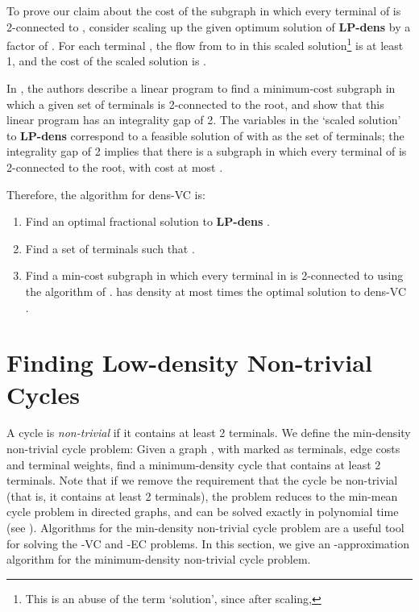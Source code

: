 \documentclass[11pt]{article}
\newcommand{\kec}[1]{-{\sc EC} }
\newcommand{\kvc}[1]{-{\sc VC} }
\newcommand{\ke}{\kec{2}}
\newcommand{\kv}{\kvc{2}}
\newcommand{\densV}{dens-{\sc VC} }
\newcommand{\densLP}{{\bf LP-dens} }
\begin{document}
To prove our claim about the cost of the subgraph  in which every
terminal of  is 2-connected to , consider scaling up the given
optimum solution of \densLP by a factor of . For each
terminal , the flow from  to  in this scaled
solution\footnote{This is an abuse of the term `solution', since after
  scaling, } is at least 1, and the cost
of the scaled solution is .

In \cite{FleischerJW}, the authors describe a linear program  to
find a minimum-cost subgraph in which a given set of terminals is
2-connected to the root, and show that this linear program has an
integrality gap of 2. The variables  in the `scaled solution' to
\densLP correspond to a feasible solution of  with  as the
set of terminals; the integrality gap of 2 implies that there is a
subgraph  in which every terminal of  is 2-connected to the
root, with cost at most .

Therefore, the algorithm for \densV is: 
\begin{enumerate}
  \item Find an optimal fractional solution to \densLP.

  \item Find a set of terminals  such that .

  \item Find a min-cost subgraph  in which every terminal in 
    is 2-connected to  using the algorithm of \cite{FleischerJW}.
     has density at most  times the optimal solution
    to \densV.
\end{enumerate}

\section{Finding Low-density Non-trivial Cycles}
\label{sec:cycles}

A cycle  is \emph{non-trivial} if it contains at least 2
terminals.  We define the min-density non-trivial cycle problem: Given a
graph , with  marked as terminals, edge costs and
terminal weights, find a minimum-density cycle that contains at least 2
terminals. Note that if we remove the requirement that the cycle be
non-trivial (that is, it contains at least 2 terminals), the problem
reduces to the min-mean cycle problem in directed graphs, and can be solved
exactly in polynomial time (see \cite{networkflows_book}).  Algorithms for
the min-density non-trivial cycle problem are a useful tool for solving the
\kv and \ke problems. In this section, we give an -approximation algorithm for the minimum-density non-trivial cycle
problem.
\end{document}
